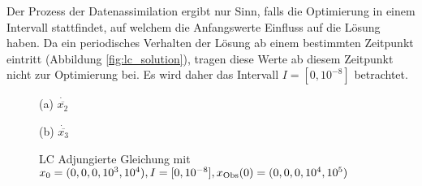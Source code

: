 Der Prozess der Datenassimilation ergibt nur Sinn, falls die Optimierung in einem Intervall stattfindet, auf welchem die Anfangswerte Einfluss auf die Lösung haben.  Da ein periodisches Verhalten der Lösung ab einem bestimmten Zeitpunkt eintritt (Abbildung \ref{fig:lc_solution}), tragen diese Werte ab diesem Zeitpunkt nicht zur Optimierung bei. Es wird daher das Intervall $I = [0,10^{-8}]$ betrachtet.
 
\begin{figure}[H]
\footnotesize
\begin{minipage}[b]{0.49\linewidth}
\centering

\caption*{(a) $\dot{\overline{x_2}}$}
\end{minipage}
\begin{minipage}[b]{0.49\linewidth}
\centering

\caption*{(b) $\dot{\overline{x_3}}$}
\end{minipage}
\caption{LC Adjungierte Gleichung mit $x_0=(0,0,0,10^3,10^{4}),I=[0,10^{-8}], x_{\text{Obs}}(0) = (0,0,0,10^4,10^5)$}
\label{fig:lcAdjointEqRHS}
\end{figure} 
 
 
 
